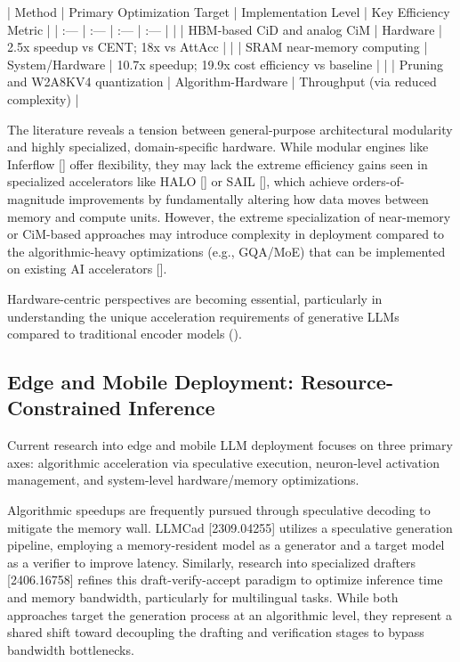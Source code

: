 \documentclass[11pt]{article}
\begin{document}
| Method | Primary Optimization Target | Implementation Level | Key Efficiency Metric |
| :--- | :--- | :--- | :--- |
| \citep{2510.02675} | HBM-based CiD and analog CiM | Hardware | 2.5x speedup vs CENT; 18x vs AttAcc |
| \citep{2509.25853} | SRAM near-memory computing | System/Hardware | 10.7x speedup; 19.9x cost efficiency vs baseline |
| \citep{2505.03745} | Pruning and W2A8KV4 quantization | Algorithm-Hardware | Throughput (via reduced complexity) |

The literature reveals a tension between general-purpose architectural modularity and highly specialized, domain-specific hardware. While modular engines like Inferflow [\citep{2401.08294}] offer flexibility, they may lack the extreme efficiency gains seen in specialized accelerators like HALO [\citep{2510.02675}] or SAIL [\citep{2509.25853}], which achieve orders-of-magnitude improvements by fundamentally altering how data moves between memory and compute units. However, the extreme specialization of near-memory or CiM-based approaches may introduce complexity in deployment compared to the algorithmic-heavy optimizations (e.g., GQA/MoE) that can be implemented on existing AI accelerators [\citep{2407.09111}].

Hardware-centric perspectives are becoming essential, particularly in understanding the unique acceleration requirements of generative LLMs compared to traditional encoder models (\citep{2410.04466}).
\subsection{Edge and Mobile Deployment: Resource-Constrained Inference}

Current research into edge and mobile LLM deployment focuses on three primary axes: algorithmic acceleration via speculative execution, neuron-level activation management, and system-level hardware/memory optimizations.

Algorithmic speedups are frequently pursued through speculative decoding to mitigate the memory wall. LLMCad [2309.04255] utilizes a speculative generation pipeline, employing a memory-resident model as a generator and a target model as a verifier to improve latency. Similarly, research into specialized drafters [2406.16758] refines this draft-verify-accept paradigm to optimize inference time and memory bandwidth, particularly for multilingual tasks. While both approaches target the generation process at an algorithmic level, they represent a shared shift toward decoupling the drafting and verification stages to bypass bandwidth bottlenecks.
\end{document}
